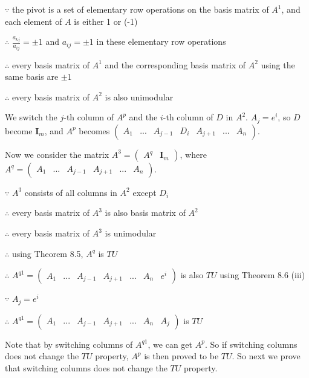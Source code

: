 $\because$ the pivot is a set of elementary row operations on the basis matrix of $A^1$, and each element of $A$ is either 1 or (-1)

$\therefore$ $\frac{a_{kj}}{a_{ij}}=\pm1$ and $a_{ij}=\pm1$ in these elementary row operations

$\therefore$ every basis matrix of $A^1$ and the corresponding basis matrix of $A^2$ using the same basis are $\pm1$

$\therefore$ every basis matrix of $A^2$ is also unimodular

We switch the $j$-th column of $A^p$ and the $i$-th column of $D$ in $A^2$. $A_j=e^i$, so $D$ become $\textbf{I}_m$, and $A^p$ becomes $\left(\begin{array}{ccccccc} A_1 & ... & A_{j-1} & D_i & A_{j+1} & ... & A_n \end{array}\right)$. 

Now we consider the matrix $A^3=\left( \begin{array}{cc} A^q & \textbf{I}_m \end{array}\right)$, where $A^q=\left(\begin{array}{cccccc} A_1 & ... & A_{j-1} & A_{j+1} & ... & A_n \end{array}\right)$.

$\because$ $A^3$ consists of all columns in $A^2$ except $D_i$

$\therefore$ every basis matrix of $A^3$ is also basis matrix of $A^2$

$\therefore$ every basis matrix of $A^3$ is unimodular

$\therefore$ using Theorem 8.5, $A^q$ is $TU$

$\therefore$ $A^{q1}=\left(\begin{array}{ccccccc} A_1 & ... & A_{j-1} & A_{j+1} & ... & A_n & e^i \end{array}\right)$ is also $TU$ using Theorem 8.6 (iii)

$\because$ $A_j=e^i$

$\therefore$  $A^{q1}=\left(\begin{array}{ccccccc} A_1 & ... & A_{j-1} & A_{j+1} & ... & A_n & A_j \end{array}\right)$ is $TU$

Note that by switching columns of $A^{q1}$, we can get $A^p$. So if switching columns does not change the $TU$ property, $A^p$ is then proved to be $TU$. So next we prove that switching columns does not change the $TU$ property.


